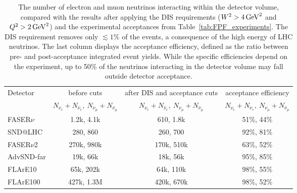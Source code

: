 \begin{table}[t]
  \centering
  \small
  \renewcommand{\arraystretch}{1.70}
  \begin{tabularx}{0.99\textwidth}{p{}|c|c|c}
    \toprule
    \multirow{2}{*}{Detector} & before cuts & after DIS and acceptance cuts  & acceptance efficiency \\
    & $N_{\nu_e} + N_{\bar{\nu}_e},~N_{\nu_\mu} + N_{\bar{\nu}_\mu}$ &  $N_{\nu_e} + N_{\bar{\nu}_e},~N_{\nu_\mu} + N_{\bar{\nu}_\mu}$ &
    $N_{\nu_e} + N_{\bar{\nu}_e},~N_{\nu_\mu} + N_{\bar{\nu}_\mu}$\\
    \midrule
    \midrule
    FASER$\nu$ & 1.2k, 4.1k  & 610, 1.8k  & 51\%, 44\% \\
    SND@LHC & 280, 860 & 260, 700 & 92\%, 81\% \\
    \midrule
    \midrule
    FASER$\nu$2 & 270k, 980k   & 170k, 510k  & 63\%, 52\%\\
    AdvSND-far & 19k, 66k &  18k, 56k & 95\%, 85\%\\
    FLArE10 & 65k, 202k  & 64k, 110k & 98\%, 55\%\\
    FLArE100 & 427k, 1.3M   & 420k, 670k &98\%, 52\%  \\
    \bottomrule
  \end{tabularx}
  \vspace{0.2cm}
  \caption{The number of electron and muon neutrinos interacting within the detector volume,
    compared with the results after applying the DIS requirements  ($W^2 > 4\,{\rm GeV}^2$ and $Q^2 > 2\,{\rm GeV}^2$)
    and the experimental acceptances from Table~\ref{tab:FPF_experiments}.
    The DIS requirement removes only  $\lesssim 1\%$ of the events, a consequence of the high energy of
    LHC neutrinos.
    The last column displays the acceptance efficiency, defined as the ratio between pre- and post-acceptance
    integrated event yields.
    While the specific efficiencies depend on the experiment, up to 50\% of the neutrinos
  interacting in the detector volume may fall outside detector acceptance. }
\label{tab:acceptance}
\end{table}
